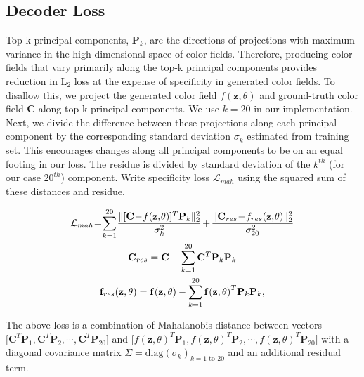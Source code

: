 \documentclass[10pt,twocolumn,letterpaper]{article}
\begin{document}
\subsection{Decoder Loss}\label{sec:vae_dec_loss} Top-k principal components, $\mathbf{P}_k$, are the directions of 
projections with maximum variance in the high dimensional space of color fields. 
Therefore, producing color fields that vary primarily along the top-k principal components 
provides reduction in L$_2$ loss at the expense of specificity in generated color fields. To 
disallow this, we project the generated color field $f(\mathbf{z}, \theta)$ and ground-truth 
color field $\mathbf{C}$ along top-k principal components. We use $k=20$ in our implementation. Next, we divide the 
difference between these projections along each principal component by the corresponding 
standard deviation $\sigma_{k}$ estimated from training set. This encourages changes along 
all principal components to be on an equal footing in our loss. The 
residue is divided by standard deviation of the $k^{th}$ (for our case $20^{th}$) component. 
Write specificity loss $\mathcal{L}_{mah}$ using the squared sum of these distances and residue,

\begin{gather*}
\medmuskip=1mu
\thinmuskip=1mu
\thickmuskip=1mu
\label{eq:vae_loss_pca}
\mathcal{L}_{mah} = \sum\limits_{k=1}^{20} \frac{\| \lbrack \mathbf{C} - f({\mathbf{z}, \theta})\rbrack^{T} 
\mathbf{P}_{k} \|^{2}_{2}}{\sigma^{2}_{k}} \; + \; 
\frac{\| \mathbf{C}_{res} - f_{res}(\mathbf{z}, \theta)\|^{2}_{2}}{\sigma^{2}_{20}} \\
\mathbf{C}_{res} = \mathbf{C} - \sum\limits_{k=1}^{20} \mathbf{C}^{T}\mathbf{P}_k \mathbf{P}_k \\ 
\mathbf{f}_{res}(\mathbf{z}, \theta) = \mathbf{f(\mathbf{z}, \theta)} - \sum\limits_{k=1}^{20} \mathbf{f(\mathbf{z}, \theta)}^{T}\mathbf{P}_k \mathbf{P}_k,  
\end{gather*}

The above loss is a combination of Mahalanobis distance \cite{mah30} between vectors
$\lbrack \mathbf{C}^{T}\mathbf{P}_1, \mathbf{C}^{T}\mathbf{P}_2, \cdots, \mathbf{C}^{T}\mathbf{P}_{20} \rbrack$
and $\lbrack f(\mathbf{z}, \theta)^{T}\mathbf{P}_1, f(\mathbf{z}, \theta)^{T}\mathbf{P}_2, \cdots, f(\mathbf{z}, \theta)^{T}\mathbf{P}_{20} \rbrack$ with a diagonal covariance matrix $\Sigma = \text{diag}(\sigma_{k})_{k=1 \text{ to } 20}$ and an additional residual term. \\
\end{document}
